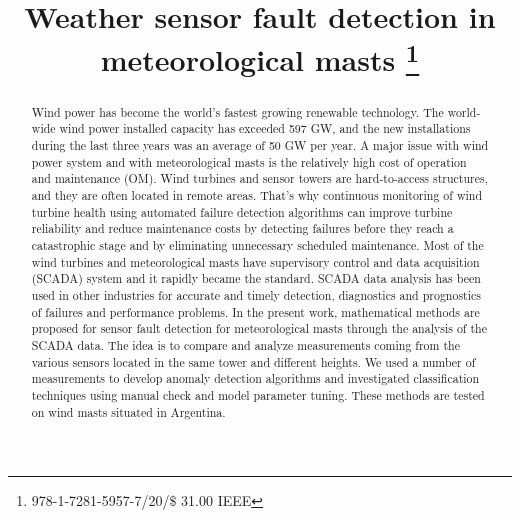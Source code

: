 \documentclass[conference]{IEEEtran}
\begin{document}
\title{Weather sensor fault detection in meteorological masts
\thanks{978-1-7281-5957-7/20/$\$$ 31.00  IEEE}}

\author{
\and
{}

\and
{}
}
\maketitle

\begin{abstract}
Wind power has become the world's fastest growing renewable technology. The world-wide wind power installed capacity has exceeded 597 GW, and the new installations during the last three years was an average of 50 GW per year. A major issue with wind power system and with meteorological masts is the relatively high cost of operation and maintenance (OM). Wind turbines and sensor towers are hard-to-access structures, and they are often located in remote areas. That's why continuous monitoring of wind turbine health using automated failure detection algorithms can improve turbine reliability and reduce maintenance costs by detecting failures before they reach a catastrophic stage and by eliminating unnecessary scheduled maintenance.
Most of the wind turbines and meteorological masts have supervisory control and data acquisition (SCADA) system and it rapidly became the standard. SCADA data analysis has been used in other industries for accurate and timely detection, diagnostics and prognostics of failures and performance problems.
In the present work, mathematical methods are proposed for sensor fault detection for meteorological masts through the analysis of the SCADA data. The idea is to compare and analyze measurements coming from the various sensors located in the same tower and different heights. We used a number of measurements to develop anomaly detection algorithms and investigated classification techniques using manual check and model parameter tuning. 
These methods are tested on wind masts situated in Argentina.
\end{abstract}
\end{document}
